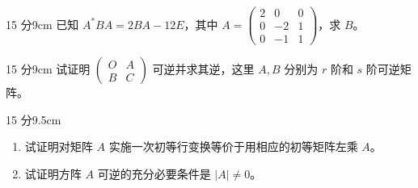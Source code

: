 \begin{problem}{15 分}{9cm}
已知 $A^{*}BA=2BA-12E$，其中
$A=\begin{pmatrix}2&0&0\\0&-2&1\\0&-1&1\end{pmatrix}$，求 $B$。
\end{problem}

\begin{problem}{15 分}{9cm}
试证明 $\begin{pmatrix}O&A\\B&C\end{pmatrix}$ 可逆并求其逆，这里 $A,B$ 分别为 $r$ 阶和 $s$ 阶可逆矩阵。
\end{problem}

\begin{problem}{15 分}{9.5cm}
\begin{enumerate}[label=(\arabic*),leftmargin=2.2em,itemsep=0.3em,topsep=0.3em]
  \item 试证明对矩阵 $A$ 实施一次初等行变换等价于用相应的初等矩阵左乘 $A$。
  \item 试证明方阵 $A$ 可逆的充分必要条件是 $|A|\ne 0$。
\end{enumerate}
\end{problem}
